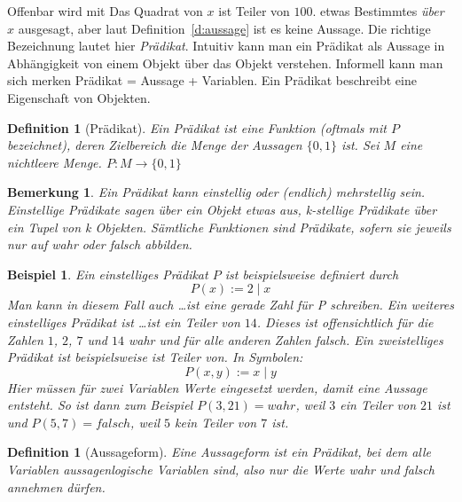 \documentclass[a4paper]{article}
\newtheorem{beispiel}[satz]{Beispiel}
\newtheorem{bemerkung}[satz]{Bemerkung}
\newtheorem{definition}[satz]{Definition} %
\theoremstyle{nonumberplain}
\begin{document}
Offenbar wird mit \glqq Das Quadrat von $x$ ist Teiler von $100$.\grqq{} etwas Bestimmtes \textit{über} $x$ ausgesagt, aber laut Definition~\ref{d:aussage} ist es keine Aussage. Die richtige Bezeichnung lautet hier \textit{Prädikat}. Intuitiv kann man ein Prädikat als Aussage in Abhängigkeit von einem Objekt über das Objekt verstehen. Informell kann man sich merken \glqq Prädikat = Aussage + Variablen\grqq{}. Ein Prädikat beschreibt eine Eigenschaft von Objekten.

\begin{definition}[Prädikat]
Ein Prädikat ist eine Funktion (oftmals mit $P$ bezeichnet), deren Zielbereich die Menge der Aussagen $\lbrace 0,1 \rbrace$ ist. Sei $M$ eine nichtleere Menge. $P : M \to \lbrace 0,1 \rbrace$
\end{definition}

\begin{bemerkung}
Ein Prädikat kann einstellig oder (endlich) mehrstellig sein. Einstellige Prädikate sagen über ein Objekt etwas aus, k-stellige Prädikate über ein Tupel von k Objekten. Sämtliche Funktionen sind Prädikate, sofern sie jeweils nur auf wahr oder falsch abbilden.
\end{bemerkung}

\begin{beispiel}
Ein einstelliges Prädikat $P$ ist beispielsweise definiert durch
\[
P(x):= 2 \mid x
\]
Man kann in diesem Fall auch \glqq \dots ist eine gerade Zahl\grqq{} für P schreiben. Ein weiteres einstelliges Prädikat ist \glqq \dots ist ein Teiler von $14$\grqq. Dieses ist offensichtlich für die Zahlen $1$, $2$, $7$ und $14$ wahr und für alle anderen Zahlen falsch. Ein zweistelliges Prädikat ist beispielsweise \glqq ist Teiler von\grqq{}. In Symbolen:
\[
P(x,y):= x \mid y
\]
Hier müssen für zwei Variablen Werte eingesetzt werden, damit eine Aussage entsteht. So ist dann zum Beispiel $P(3,21)=wahr$, weil $3$ ein Teiler von $21$ ist und $P(5,7)=falsch$, weil $5$ kein Teiler von $7$ ist.
\end{beispiel}

\begin{definition}[Aussageform]
Eine Aussageform ist ein Prädikat, bei dem alle Variablen aussagenlogische Variablen sind, also nur die Werte wahr und falsch annehmen dürfen.
\end{definition}
\end{document}

